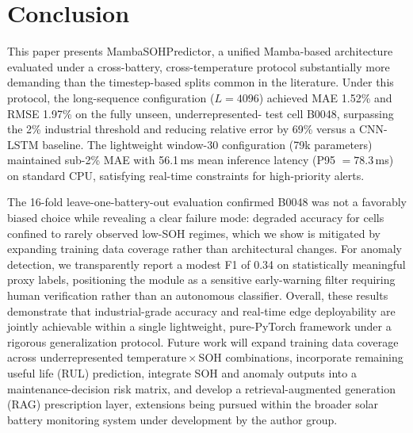 \section{Conclusion}
\label{sec:conclusion}

This paper presents MambaSOHPredictor, a unified Mamba-based architecture
evaluated under a cross-battery, cross-temperature protocol substantially more
demanding than the timestep-based splits common in the literature. Under this
protocol, the long-sequence configuration ($L = 4096$) achieved MAE 1.52\% and
RMSE 1.97\% on the fully unseen, underrepresented- test cell B0048,
surpassing the 2\% industrial threshold and reducing relative error by 69\%
versus a CNN-LSTM baseline. The lightweight window-30 configuration (79k
parameters) maintained sub-2\% MAE with 56.1\,ms mean inference latency
(P95 $= 78.3$\,ms) on standard CPU, satisfying real-time constraints for
high-priority alerts.

The 16-fold leave-one-battery-out evaluation confirmed B0048 was not a favorably
biased choice while revealing a clear failure mode: degraded accuracy for cells
confined to rarely observed low-SOH regimes, which we show is mitigated by
expanding training data coverage rather than architectural changes. For anomaly
detection, we transparently report a modest F1 of 0.34 on statistically
meaningful proxy labels, positioning the module as a sensitive early-warning
filter requiring human verification rather than an autonomous classifier.
Overall, these results demonstrate that industrial-grade accuracy and real-time
edge deployability are jointly achievable within a single lightweight,
pure-PyTorch framework under a rigorous generalization protocol. Future work
will expand training data coverage across underrepresented
temperature\,$\times$\,SOH combinations, incorporate remaining useful life (RUL)
prediction, integrate SOH and anomaly outputs into a maintenance-decision risk
matrix, and develop a retrieval-augmented generation (RAG) prescription layer,
extensions being pursued within the broader solar battery monitoring system
under development by the author group.
